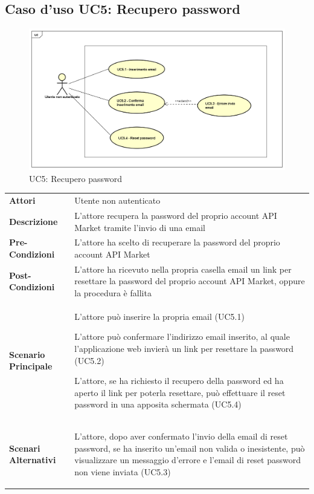 \newpage
\subsection{Caso d'uso UC5: Recupero password}
\label{UC5}
\begin{figure}[ht]
	\centering
	\includegraphics[scale=0.45]{UML/UC5.png}
	\caption{UC5: Recupero password}
\end{figure}

\begin{longtable}{ l | p{11cm}}
	\hline
	\rowcolor{Gray}
	 \multicolumn{2}{c}{UC5 - Recupero password} \\
	 \hline
	\textbf{Attori} & Utente non autenticato \\
	\textbf{Descrizione} & L'attore recupera la password del proprio account API Market tramite l'invio di una email \\
	\textbf{Pre-Condizioni} & L'attore ha scelto di recuperare la password del proprio account API Market \\
	\textbf{Post-Condizioni} & L'attore ha ricevuto nella propria casella email un link per resettare la password del proprio account API Market, oppure la procedura è fallita \\
	\textbf{Scenario Principale} & 
	\begin{enumerate*}[label=(\arabic*.),itemjoin={\newline}]
		\item L'attore può inserire la propria email (UC5.1)
		\item L'attore può confermare l'indirizzo email inserito, al quale l'applicazione web invierà un link per resettare la password (UC5.2)
		\item L'attore, se ha richiesto il recupero della password ed ha aperto il link per poterla resettare, può effettuare il reset password in una apposita schermata (UC5.4)
	\end{enumerate*}\\
	\textbf{Scenari Alternativi} & 
	\begin{enumerate*}[label=(\arabic*.),itemjoin={\newline}]
		\item L'attore, dopo aver confermato l'invio della email di reset password, se ha inserito un'email non valida o inesistente, può visualizzare un messaggio d'errore e l'email di reset password non viene inviata (UC5.3)
	\end{enumerate*}\\
\end{longtable}

